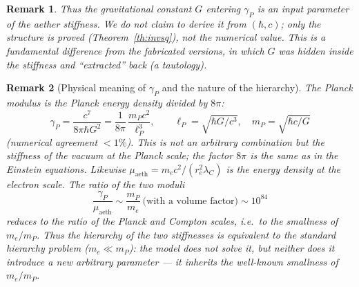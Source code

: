 \documentclass[12pt,a4paper]{article}
\newtheorem{remark}{Remark}
\begin{document}
\begin{remark}
Thus the gravitational constant $G$ entering $\gamma_P$ is an \emph{input}
parameter of the aether stiffness. We do not claim to derive it from $(\hbar,c)$;
only the \emph{structure} is proved (Theorem~\ref{th:invsq}), not the numerical
value. This is a fundamental difference from the fabricated versions, in which
$G$ was hidden inside the stiffness and ``extracted'' back (a tautology).
\end{remark}

\begin{remark}[Physical meaning of $\gamma_P$ and the nature of the hierarchy]
The Planck modulus is the Planck \emph{energy density} divided by $8\pi$:
\begin{equation}
\gamma_P=\frac{c^7}{8\pi\hbar G^2}=\frac{1}{8\pi}\,\frac{m_P c^2}{\ell_P^3},
\qquad \ell_P=\sqrt{\hbar G/c^3},\quad m_P=\sqrt{\hbar c/G}
\end{equation}
(numerical agreement $<1\%$). This is not an arbitrary combination but the
stiffness of the vacuum at the Planck scale; the factor $8\pi$ is the same as
in the Einstein equations. Likewise $\mu_{\text{aeth}}=m_e c^2/(r_e^2\lambda_C)$
is the energy density at the electron scale. The ratio of the two moduli
\begin{equation}
\frac{\gamma_P}{\mu_{\text{aeth}}}\sim\frac{m_P}{m_e}\ \text{(with a volume factor)}\sim10^{84}
\end{equation}
reduces to the ratio of the Planck and Compton scales, i.e.\ to the smallness
of $m_e/m_P$. Thus the hierarchy of the two stiffnesses is \emph{equivalent} to
the standard \emph{hierarchy problem} ($m_e\ll m_P$): the model does not solve
it, but neither does it introduce a new arbitrary parameter --- it inherits the
well-known smallness of $m_e/m_P$.
\end{remark}
\end{document}
